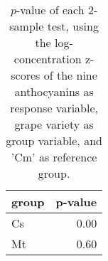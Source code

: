 \begin{table}[ht]
\centering
\begin{tabular}{lr}
  \hline
group & p-value \\ 
  \hline
Cs & 0.00 \\ 
  Mt & 0.60 \\ 
   \hline
\end{tabular}
\caption{
            $p$-value of each 2-sample test, using the log-concentration 
            z-scores of the nine anthocyanins as response variable, 
            grape variety as group variable, and 'Cm' 
            as reference group.
        } 
\label{tbl:1}
\end{table}
